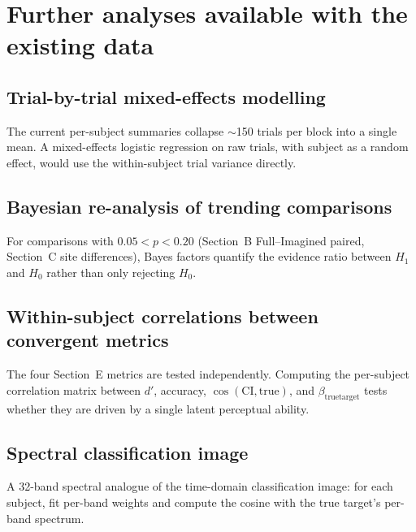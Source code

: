 \documentclass[11pt]{article}
\begin{document}
\section{Further analyses available with the existing data}

\subsection{Trial-by-trial mixed-effects modelling}

The current per-subject summaries collapse $\sim$150 trials per block
into a single mean. A mixed-effects logistic regression on raw trials,
with subject as a random effect, would use the within-subject trial
variance directly.

\subsection{Bayesian re-analysis of trending comparisons}

For comparisons with $0.05 < p < 0.20$ (Section~B Full--Imagined paired,
Section~C site differences), Bayes factors quantify the evidence ratio
between $H_1$ and $H_0$ rather than only rejecting $H_0$.

\subsection{Within-subject correlations between convergent metrics}

The four Section~E metrics are tested independently. Computing the
per-subject correlation matrix between $d'$, accuracy, $\cos(\mathrm{CI},
\text{true})$, and $\beta_{\text{truetarget}}$ tests whether they are
driven by a single latent perceptual ability.

\subsection{Spectral classification image}

A 32-band spectral analogue of the time-domain classification image: for
each subject, fit per-band weights and compute the cosine with the true
target's per-band spectrum.
\end{document}

